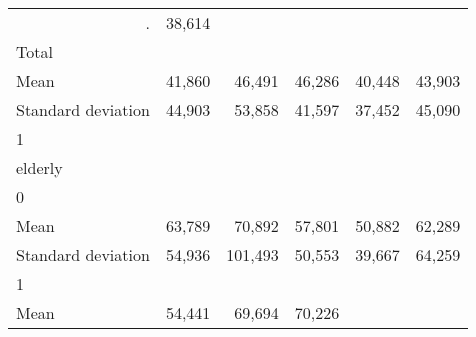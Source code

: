 \begin{tabular}{llllll}
  \multicolumn{1}{r}{.} &
  \multicolumn{1}{r}{38,614} \\
\multicolumn{1}{l}{\hspace{3em}Total} &
  \multicolumn{1}{|r}{} &
  \multicolumn{1}{r}{} &
  \multicolumn{1}{r}{} &
  \multicolumn{1}{r}{} &
  \multicolumn{1}{r}{} \\
\multicolumn{1}{l}{\hspace{4em}Mean} &
  \multicolumn{1}{|r}{41,860} &
  \multicolumn{1}{r}{46,491} &
  \multicolumn{1}{r}{46,286} &
  \multicolumn{1}{r}{40,448} &
  \multicolumn{1}{r}{43,903} \\
\multicolumn{1}{l}{\hspace{4em}Standard deviation} &
  \multicolumn{1}{|r}{44,903} &
  \multicolumn{1}{r}{53,858} &
  \multicolumn{1}{r}{41,597} &
  \multicolumn{1}{r}{37,452} &
  \multicolumn{1}{r}{45,090} \\
\multicolumn{1}{l}{\hspace{1em}1} &
  \multicolumn{1}{|r}{} &
  \multicolumn{1}{r}{} &
  \multicolumn{1}{r}{} &
  \multicolumn{1}{r}{} &
  \multicolumn{1}{r}{} \\
\multicolumn{1}{l}{\hspace{2em}elderly} &
  \multicolumn{1}{|r}{} &
  \multicolumn{1}{r}{} &
  \multicolumn{1}{r}{} &
  \multicolumn{1}{r}{} &
  \multicolumn{1}{r}{} \\
\multicolumn{1}{l}{\hspace{3em}0} &
  \multicolumn{1}{|r}{} &
  \multicolumn{1}{r}{} &
  \multicolumn{1}{r}{} &
  \multicolumn{1}{r}{} &
  \multicolumn{1}{r}{} \\
\multicolumn{1}{l}{\hspace{4em}Mean} &
  \multicolumn{1}{|r}{63,789} &
  \multicolumn{1}{r}{70,892} &
  \multicolumn{1}{r}{57,801} &
  \multicolumn{1}{r}{50,882} &
  \multicolumn{1}{r}{62,289} \\
\multicolumn{1}{l}{\hspace{4em}Standard deviation} &
  \multicolumn{1}{|r}{54,936} &
  \multicolumn{1}{r}{101,493} &
  \multicolumn{1}{r}{50,553} &
  \multicolumn{1}{r}{39,667} &
  \multicolumn{1}{r}{64,259} \\
\multicolumn{1}{l}{\hspace{3em}1} &
  \multicolumn{1}{|r}{} &
  \multicolumn{1}{r}{} &
  \multicolumn{1}{r}{} &
  \multicolumn{1}{r}{} &
  \multicolumn{1}{r}{} \\
\multicolumn{1}{l}{\hspace{4em}Mean} &
  \multicolumn{1}{|r}{54,441} &
  \multicolumn{1}{r}{69,694} &
  \multicolumn{1}{r}{70,226} &

\end{tabular}
